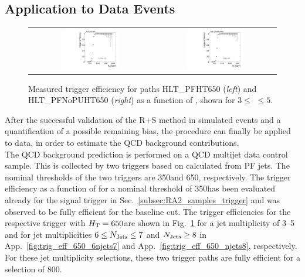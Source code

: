 \subsection{Application to Data Events}
\label{subsec:validation_data_R+S}
\begin{figure}[!t]
  \centering
  \begin{tabular}{cc}
                \includegraphics[width=0.49\textwidth]{figures/turn_on_HT_TagEle27WP80_ProbePFHT650_chs_NJets3-5.pdf} &
                \includegraphics[width=0.49\textwidth]{figures/turn_on_HT_TagEle27WP80_ProbePFNoPUHT650_chs_NJets3-5.pdf} \\
  \end{tabular}
\caption{Measured trigger efficiency for paths HLT\_PFHT650 (\textit{left}) and HLT\_PFNoPUHT650 (\textit{right}) as a function of \HT, shown for $3 \leq$ \NJets $\leq 5$.} 
  \label{fig:trig_eff_650_3njets5}
\end{figure}
After the successful validation of the R+S method in simulated events and a quantification of a possible remaining bias, the procedure can finally be applied to data, in order to estimate the QCD background contributions. \\
The QCD background prediction is performed on a QCD multijet data control sample. This is collected by two triggers based on \HT calculated from PF jets. The nominal \HT thresholds of the two triggers are 350\gev and 650\gev, respectively. The trigger efficiency as a function of \HT for a nominal threshold of 350\gev has been evaluated already for the signal trigger in Sec.~\ref{subsec:RA2_samples_trigger} and was observed to be fully efficient for the baseline \HT cut. The trigger efficiencies for the respective trigger with $H_{\text{T}} = 650$\gev are shown in Fig.~\ref{fig:trig_eff_650_3njets5} for a jet multiplicity of 3--5 and for jet multiplicities $6 \leq N_{\text{Jets}} \leq 7$ and $N_{\text{Jets}} \geq 8$ in App.~\ref{fig:trig_eff_650_6njets7} and App.~\ref{fig:trig_eff_650_njets8}, respectively. For these jet multiplicity selections, these two trigger paths are fully efficient for a \HT selection of 800\gev. \\
